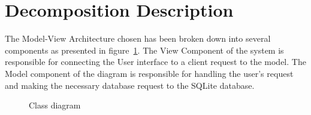 \documentclass[letterpaper,12pt,oneside,listof=totoc]{scrreprt}
\begin{document}
\section{Decomposition Description}
The Model-View Architecture chosen has been broken down into several components as presented in figure~\ref{class1}. The View Component of the system is responsible for connecting the User interface to a client request to the model. The Model component of the diagram is responsible for handling the user's request and making the necessary database request to the SQLite database. 


\begin{figure}
\centering
{}
\caption{Class diagram}
\label{class1}
\end{figure}
\end{document}
